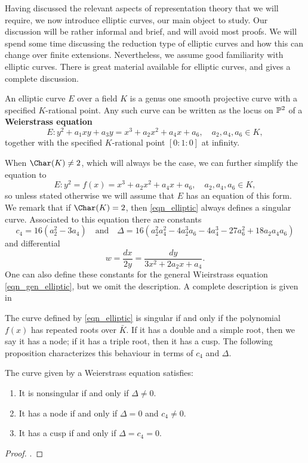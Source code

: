 
Having discussed the relevant aspects of representation theory that we will require, we now introduce elliptic curves, our main object to study. Our discussion will be rather informal and brief, and will avoid most proofs. We will spend some time discussing the reduction type of elliptic curves and how this can change over finite extensions. Nevertheless, we assume good familiarity with elliptic curves. There is great material available for elliptic curves, and \cite{S1} gives a complete discussion.

An elliptic curve $E$ over a field $K$ is a genus one smooth projective curve with a specified $K$-rational point. Any such curve can be written as the locus on $\mathbb{P}^2$ of a \textbf{Weierstrass equation}
\begin{equation}\label{eqn_gen_elliptic}
    E: y^2+a_1xy+a_3y=x^3+a_2x^2+a_4x+a_6,\quad a_2,a_4,a_6\in K,
\end{equation}
together with the specified $K$-rational point $[0:1:0]$ at infinity.

When $\Char(K)\neq2$, which will always be the case, we can further simplify the equation to
\begin{equation}\label{eqn_elliptic}
    E: y^2=f(x)=x^3+a_2x^2+a_4x+a_6,\quad a_2,a_4,a_6\in K,
\end{equation}
so unless stated otherwise we will assume that $E$ has an equation of this form. We remark that if $\Char(K)=2$, then \eqref{eqn_elliptic} always defines a singular curve. Associated to this equation there are constants 
$$c_4=16(a_2^2-3a_4) \quad\text{and}\quad \Delta=16(a_2^2a_4^2-4a_2^3a_6-4a_4^3-27a_6^2+18a_2a_4a_6)$$
and differential 
\begin{equation}\label{eqn_differential}
    w=\frac{dx}{2y}=\frac{dy}{3x^2+2a_2x+a_4}.
\end{equation}
One can also define these constants for the general Wieirstrass equation \eqref{eqn_gen_elliptic}, but we omit the description. A complete description is given in \cite[\S III.1]{S1}

The curve defined by \eqref{eqn_elliptic} is singular if and only if the polynomial $f(x)$ has repeated roots over $\bar{K}$. If it has a double and a simple root, then we say it has a node; if it has a triple root, then it has a cusp. The following proposition characterizes this behaviour in terms of $c_4$ and $\Delta$.

\begin{prop}\label{prop_nodecusp}
    The curve given by a Weierstrass equation satisfies:
    \begin{enumerate}
        \item It is nonsingular if and only if $\Delta\neq0$.
        \item It has a node if and only if $\Delta=0$ and $c_4 \neq 0$.
        \item It has a cusp if and only if $\Delta= c_4 = 0$. 
    \end{enumerate}
\end{prop}
\begin{proof}
    \cite[\S III Proposition 1.4]{S1}.
\end{proof}

